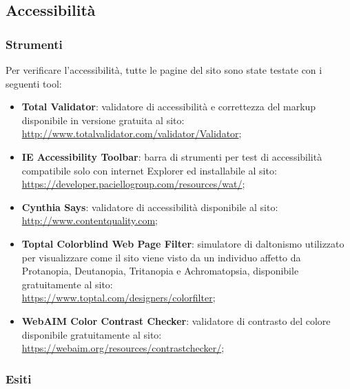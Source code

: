 \documentclass[12pt]{article}
\begin{document}
	\subsection{Accessibilità}
	
	\subsubsection{Strumenti}
	
	Per verificare l'accessibilità, tutte le pagine del sito sono state testate con i seguenti tool:
	
	\begin{itemize}
		\item \textbf{Total Validator}: validatore di accessibilità e correttezza del markup disponibile in versione gratuita al sito:
		\\ \url{http://www.totalvalidator.com/validator/Validator};
		
		\item \textbf{IE Accessibility Toolbar}: barra di strumenti per test di accessibilità compatibile solo con internet Explorer ed installabile al sito:
		\\ \url{https://developer.paciellogroup.com/resources/wat/};
		
		\item \textbf{Cynthia Says}: validatore di accessibilità disponibile al sito: 
		\\ \url{http://www.contentquality.com};
		
		\item \textbf{Toptal Colorblind Web Page Filter}: simulatore di daltonismo utilizzato per visualizzare come il sito viene visto da un individuo affetto da Protanopia, Deutanopia, Tritanopia e Achromatopsia, disponibile gratuitamente al sito: 
		\\ \url{https://www.toptal.com/designers/colorfilter};
		
		\item \textbf{WebAIM Color Contrast Checker}: validatore di contrasto del colore disponibile gratuitamente al sito: 
		\\ \url{https://webaim.org/resources/contrastchecker/};
	\end{itemize}
	
	\subsubsection{Esiti}
	
\end{document}
